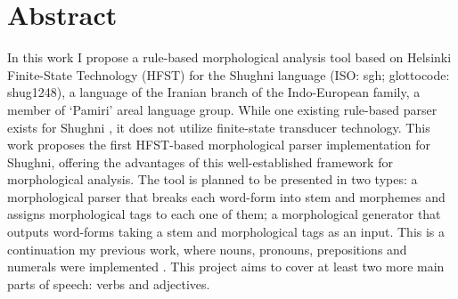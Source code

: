 \section*{Abstract}

In this work I propose a rule-based morphological analysis tool based on Helsinki Finite-State Technology (HFST) for the Shughni language (ISO: sgh; glottocode: shug1248), a language of the Iranian branch of the Indo-European family, a member of `Pamiri' areal language group. While one existing rule-based parser exists for Shughni \parencite{melchenko_2021_parser}, it does not utilize finite-state transducer technology. This work proposes the first HFST-based morphological parser implementation for Shughni, offering the advantages of this well-established framework for morphological analysis. The tool is planned to be presented in two types: a morphological parser that breaks each word-form into stem and morphemes and assigns morphological tags to each one of them; a morphological generator that outputs word-forms taking a stem and morphological tags as an input. This is a continuation my previous work, where nouns, pronouns, prepositions and numerals were implemented \parencite{osorgin_2024_twol}. This project aims to cover at least two more main parts of speech: verbs and adjectives.
